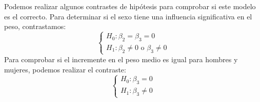 \begin{example}
    Podemos realizar algunos contrastes de hipótesis para comprobar si este modelo es el correcto.
    Para determinar si el sexo tiene una influencia significativa en el peso, contrastamos:
    $$\begin{cases}
            H_0: \beta_2 = \beta_3 = 0 \\
            H_1: \beta_2 \neq 0 \text{ o } \beta_3 \neq 0
        \end{cases}$$
    Para comprobar si el incremente en el peso medio es igual para hombres y mujeres, podemos realizar el contraste:
    $$\begin{cases}
            H_0: \beta_3 = 0 \\
            H_1: \beta_3 \neq 0
        \end{cases}$$
\end{example}

